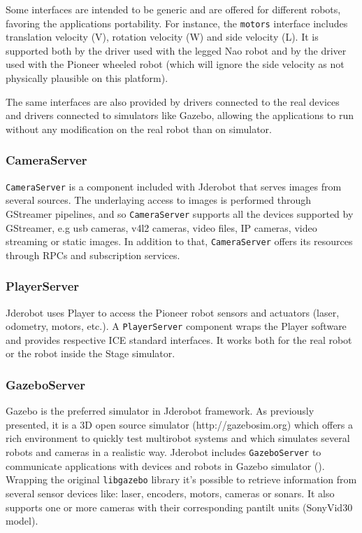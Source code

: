 \documentclass[twocolumn]{svjour3}          %
\begin{document}
Some interfaces are intended to be generic and are offered for different robots, favoring the applications portability. For instance, the \texttt{motors} interface includes translation velocity (V), rotation velocity (W) and side velocity (L). It is supported both by the driver used with the legged Nao robot and by the driver used with the Pioneer wheeled robot (which will ignore the side velocity as not physically plausible on this platform).

The same interfaces are also provided by drivers connected to the real devices and drivers connected to simulators like Gazebo, allowing the applications to run without any modification on the real robot than on simulator. 


\subsubsection{CameraServer}

\texttt{CameraServer} is a component included with Jderobot that serves images from several sources. The underlaying access to images is performed through GStreamer pipelines, and so \texttt{CameraServer} supports all the devices supported by GStreamer, e.g  usb cameras, v4l2 cameras, video files, IP cameras, video streaming or static images. In addition to that, \texttt{CameraServer} offers its resources through RPCs and subscription services.

\subsubsection{PlayerServer}

Jderobot uses Player to access the Pioneer robot sensors and actuators (laser, odometry, motors, etc.). A \texttt{PlayerServer} component wraps the Player software and provides respective ICE standard interfaces. It works both for the real robot or the robot inside the Stage simulator.

\subsubsection{GazeboServer}
\label{subsec:gazeboserver}

Gazebo is the preferred simulator in Jderobot framework. As previously presented, it is a 3D open source simulator (http://gazebosim.org) which offers a rich environment to quickly test multirobot systems and which simulates several robots and cameras in a realistic way.
Jderobot includes \texttt{GazeboServer} to communicate applications with devices and robots in Gazebo simulator (\cite{koening2004}). Wrapping the original \texttt{libgazebo} library it's possible to retrieve information from several sensor devices like: laser, encoders, motors, cameras or sonars. It also supports one or more cameras with their corresponding pantilt units (SonyVid30 model).
\end{document}
